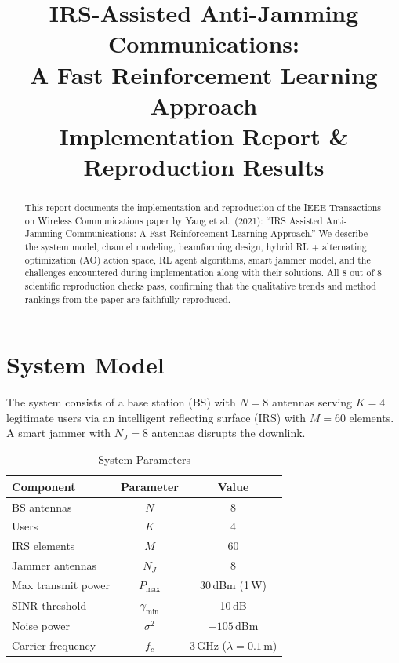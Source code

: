 \documentclass[11pt,a4paper]{article}
\title{
    \textbf{IRS-Assisted Anti-Jamming Communications:\\
    A Fast Reinforcement Learning Approach}\\[0.5em]
    \large Implementation Report \& Reproduction Results
}
\author{}
\date{}
\begin{document}
\maketitle
\thispagestyle{fancy}

\begin{abstract}
This report documents the implementation and reproduction of the IEEE Transactions on Wireless Communications paper by Yang et al.\ (2021): ``IRS Assisted Anti-Jamming Communications: A Fast Reinforcement Learning Approach.'' We describe the system model, channel modeling, beamforming design, hybrid RL + alternating optimization (AO) action space, RL agent algorithms, smart jammer model, and the challenges encountered during implementation along with their solutions. All 8 out of 8 scientific reproduction checks pass, confirming that the qualitative trends and method rankings from the paper are faithfully reproduced.
\end{abstract}

\tableofcontents
\newpage

\section{System Model}

The system consists of a base station (BS) with $N = 8$ antennas serving $K = 4$ legitimate users via an intelligent reflecting surface (IRS) with $M = 60$ elements. A smart jammer with $N_J = 8$ antennas disrupts the downlink.

\begin{table}[H]
\centering
\caption{System Parameters}
\begin{tabular}{lcc}
\toprule
\textbf{Component} & \textbf{Parameter} & \textbf{Value} \\
\midrule
BS antennas & $N$ & 8 \\
Users & $K$ & 4 \\
IRS elements & $M$ & 60 \\
Jammer antennas & $N_J$ & 8 \\
Max transmit power & $P_{\max}$ & 30\,dBm (1\,W) \\
SINR threshold & $\gamma_{\min}$ & 10\,dB \\
Noise power & $\sigma^2$ & $-105$\,dBm \\
Carrier frequency & $f_c$ & 3\,GHz ($\lambda = 0.1$\,m) \\
\bottomrule
\end{tabular}
\end{table}
\end{document}
